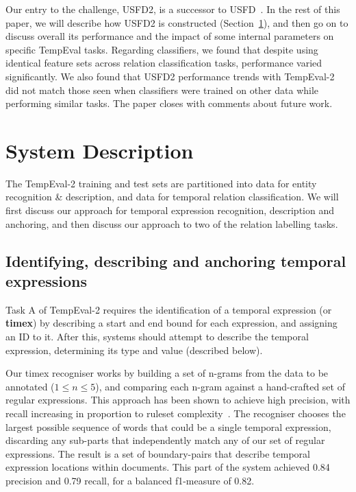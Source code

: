 \documentclass[11pt]{article}
\begin{document}
Our entry to the challenge, USFD2, is a successor to USFD~\cite{hepple2007usfd}. In the rest of this paper, we will describe how USFD2 is constructed (Section~\ref{description}), and then go on to discuss overall its performance and the impact of some internal parameters on specific TempEval tasks. Regarding classifiers, we found that despite using identical feature sets across relation classification tasks, performance varied significantly. We also found that USFD2 performance trends with TempEval-2 did not match those seen when classifiers were trained on other data while performing similar tasks. The paper closes with comments about future work.


\section{System Description}
\label{description}
The TempEval-2 training and test sets are partitioned into data for entity recognition \& description, and data for temporal relation classification. We will first discuss our approach for temporal expression recognition, description and anchoring, and then discuss our approach to two of the relation labelling tasks.

\subsection{Identifying, describing and anchoring temporal expressions}
\label{timex}
Task A of TempEval-2 requires the identification of a temporal expression (or {\bf timex}) by describing a start and end bound for each expression, and assigning an ID to it. After this, systems should attempt to describe the temporal expression, determining its type and value (described below).

Our timex recogniser works by building a set of n-grams from the data to be annotated ($1 \leq n \leq 5$), and comparing each n-gram against a hand-crafted set of regular expressions. This approach has been shown to achieve high precision, with recall increasing in proportion to ruleset complexity~\cite{han2006language,mani2000robust,ahn2005towards}. The recogniser chooses the largest possible sequence of words that could be a single temporal expression, discarding any sub-parts that independently match any of our set of regular expressions. The result is a set of boundary-pairs that describe temporal expression locations within documents. This part of the system achieved 0.84 precision and 0.79 recall, for a balanced f1-measure of 0.82.
\end{document}
